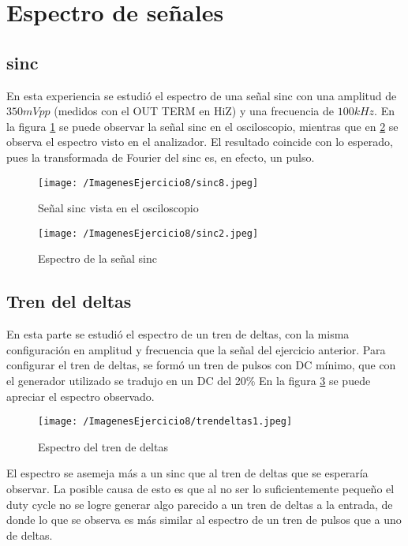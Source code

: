 \section{Espectro de señales}

\subsection{sinc}

En esta experiencia se estudió el espectro de una señal sinc con una amplitud de $350 mVpp$ (medidos con el OUT TERM en HiZ) y una frecuencia de $100 kHz$. En la figura \ref{fig:osc} se puede observar la señal sinc en el osciloscopio, mientras que en \ref{fig:sinc} se observa el espectro visto en el analizador. El resultado coincide con lo esperado, pues la transformada de Fourier del sinc es, en efecto, un pulso.

\begin{figure}[H]
	\centering
	\texttt{[image: /ImagenesEjercicio8/sinc8.jpeg]}
	\caption{Señal sinc vista en el osciloscopio}	
	\label{fig:osc}
\end{figure}

\begin{figure}[H]
	\centering
	\texttt{[image: /ImagenesEjercicio8/sinc2.jpeg]}
	\caption{Espectro de la señal sinc}	
	\label{fig:sinc}
\end{figure}

\subsection{Tren del deltas}

En esta parte se estudió el espectro de un tren de deltas, con la misma configuración en amplitud y frecuencia que la señal del ejercicio anterior. Para configurar el tren de deltas, se formó un tren de pulsos con DC mínimo, que con el generador utilizado se tradujo en un DC del 20\% En la figura \ref{fig:del} se puede apreciar el espectro observado.

\begin{figure}[H]
	\centering
	\texttt{[image: /ImagenesEjercicio8/trendeltas1.jpeg]}
	\caption{Espectro del tren de deltas}	
	\label{fig:del}
\end{figure}

El espectro se asemeja más a un sinc que al tren de deltas que se esperaría observar. La posible causa de esto es que al no ser lo suficientemente pequeño el duty cycle no se logre generar algo parecido a un tren de deltas a la entrada, de donde lo que se observa es más similar al espectro de un tren de pulsos que a uno de deltas.
